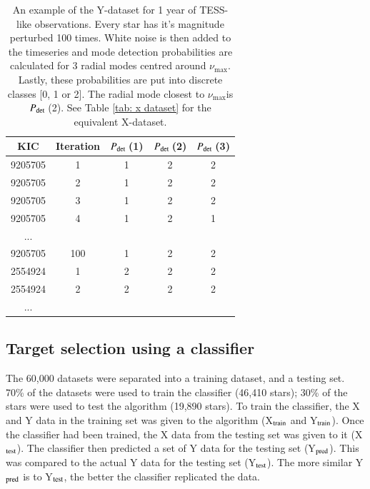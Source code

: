 \documentclass[a4paper,fleqn,usenatbib,useAMS]{mnras}
\newcommand{\numax}{\ensuremath{\nu_{\textrm{max}}}}
\newcommand{\pdet}{\ensuremath{P_{\rm det}\:}}
\begin{document}
\begin{table}
\begin{center}
\begin{tabular}{|*{5}{c|}}
KIC & Iteration & \pdet(1) & \pdet(2) & \pdet(3) \\
\hline
9205705	& 1     & 1 & 2 & 2 \\
9205705	& 2     & 1 & 2 & 2 \\
9205705	& 3     & 1 & 2 & 2 \\
9205705	& 4     & 1 & 2 & 1 \\
...                         \\
9205705	& 100   & 1 & 2 & 2 \\
2554924	& 1	    & 2 & 2 & 2 \\
2554924	& 2     & 2 & 2 & 2 \\
...                         \\
\hline
\end{tabular}
\end{center}
\caption{An example of the Y-dataset for 1 year of TESS-like observations. Every star has it's magnitude perturbed 100 times. White noise is then added to the timeseries and mode detection probabilities are calculated for 3 radial modes centred around \numax. Lastly, these probabilities are put into discrete classes [0, 1 or 2]. The radial mode closest to \numax is \pdet(2). See Table \ref{tab: x dataset} for the equivalent X-dataset.}
\label{tab: y dataset}
\end{table}



\subsection{Target selection using a classifier}
\label{sect: class-results}

The 60,000 datasets were separated into a training dataset, and a testing set. 70\% of the datasets were used to train the classifier (46,410 stars); 30\% of the stars were used to test the algorithm (19,890 stars). To train the classifier, the X and Y data in the training set was given to the algorithm (X$_{\rm train}$ and Y$_{\rm train}$). Once the classifier had been trained, the X data from the testing set was given to it (X$_{\rm test}$). The classifier then predicted a set of Y data for the testing set (Y$_{\rm pred}$). This was compared to the actual Y data for the testing set (Y$_{\rm test}$). The more similar Y$_{\rm pred}$ is to Y$_{\rm test}$, the better the classifier replicated the data.
\end{document}
